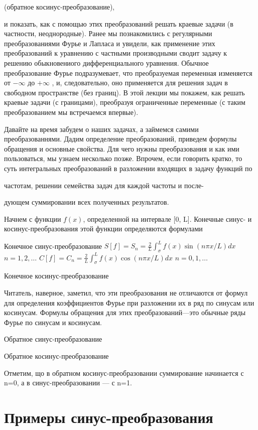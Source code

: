 \documentclass[
]{article}
\begin{document}
(обратное косинус-преобразование),

и показать, как с помощью этих преобразований решать краевые задачи (в
частности, неоднородные). Ранее мы познакомились с регулярными
преобразованиями Фурье и Лапласа и увидели, как применение этих
преобразований к уравнению с частными производными сводит задачу к
решению обыкновениого дифференциального уравнения. Обычное
преобразование Фурье подразумевает, что преобразуемая переменная
изменяется от \(-\infty\) до \(+\infty\) , и, следовательно, оно
применяется для решения задач в свободном пространстве (без границ). В
этой лекции мы покажем, как решать краевые задачи (с границами),
преобразуя ограниченные переменные (с таким преобразованием мы
встречаемся впервые).

Давайте на время забудем о наших задачах, а займемся самими
преобразованнями. Дадим определение преобразований, приведем формулы
обращения и основные свойства. Для чего нужны преобразования и как ими
пользоваться, мы узнаем несколько позже. Впрочем, если говорить кратко,
то суть интегральных преобразований в разложении входящих в задачу
функций по

частотам, решении семейства задач для каждой частоты и после-

дующем суммировании всех полученных результатов.

Начнем с функции \(f(x)\), определенной на интервале {[}0, L{]}.
Конечные синус- и косинус-преобразования этой функции определяются
формулами

Конечное синус-преобразование
\(S[f] = S_n = \frac{2}{L} \int_{\sigma}^{L} f(x) \sin(n\pi x/L) dx\)
\(n = 1, 2, \dots\)
\(C[f] = C_n = \frac{2}{L} \int_{\sigma}^{L} f(x) \cos(n\pi x/L) dx\)
\(n = 0, 1, \dots\)

Конечное косинус-преобразование

Читатель, наверное, заметил, что эти преобразования не отличаются от
формул для определения коэффициентов Фурье при разложении их в ряд по
синусам или косинусам. Формулы обращения для этих преобразований---это
обычные ряды Фурье по синусам и косинусам.

Обратное синус-преобразование

Обратное косинус-преобразование

Отметим, що в обратном косинус-преобразовании суммирование начинается с
n=0, а в синус-преобразовании --- с n=1.

\section{Примеры
синус-преобразования}\label{ux43fux440ux438ux43cux435ux440ux44b-ux441ux438ux43dux443ux441-ux43fux440ux435ux43eux431ux440ux430ux437ux43eux432ux430ux43dux438ux44f}
\end{document}
